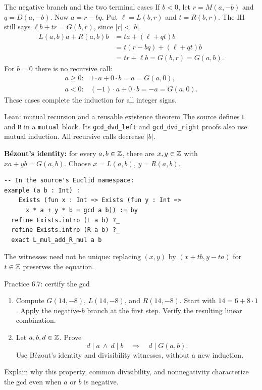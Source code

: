 \begin{frame}{The negative branch and the two terminal cases}
If $b<0$, let $r=M(a,-b)$ and $q=D(a,-b)$.
Now $a=r-bq$. Put $\ell=L(b,r)$ and $t=R(b,r)$.
The IH still says $\ell b+tr=G(b,r)$, since $|r|<|b|$.
\[
\begin{aligned}
 L(a,b)a+R(a,b)b
 &=ta+(\ell+qt)b\\
 &=t(r-bq)+(\ell+qt)b\\
 &=tr+\ell b=G(b,r)=G(a,b).
\end{aligned}
\]
For $b=0$ there is no recursive call:
\[
 \begin{array}{ll}
 a\ge0:&1\cdot a+0\cdot b=a=G(a,0),\\[2pt]
 a<0:&(-1)\cdot a+0\cdot b=-a=G(a,0).
 \end{array}
\]
These cases complete the induction for all integer signs.
\end{frame}

\begin{frame}[fragile]{Lean: mutual recursion and a reusable existence theorem}
The source defines \texttt{L} and \texttt{R} in a \texttt{mutual} block.
Its \texttt{gcd\_dvd\_left} and \texttt{gcd\_dvd\_right} proofs also use
mutual induction. All recursive calls decrease $|b|$.

\textbf{B\'ezout's identity:} for every $a,b\in\mathbb{Z}$, there are $x,y\in\mathbb{Z}$
with $xa+yb=G(a,b)$. Choose $x=L(a,b)$, $y=R(a,b)$.
\begin{lstlisting}
-- In the source's Euclid namespace:
example (a b : Int) :
    Exists (fun x : Int => Exists (fun y : Int =>
      x * a + y * b = gcd a b)) := by
  refine Exists.intro (L a b) ?_
  refine Exists.intro (R a b) ?_
  exact L_mul_add_R_mul a b
\end{lstlisting}
The witnesses need not be unique: replacing $(x,y)$ by
$(x+tb,y-ta)$ for $t\in\mathbb{Z}$ preserves the equation.
\end{frame}

\begin{frame}{Practice 6.7: certify the gcd}
\begin{enumerate}
\item Compute $G(14,-8)$, $L(14,-8)$, and $R(14,-8)$.
Start with $14=6+8\cdot1$. Apply the negative-$b$ branch at the first step.
Verify the resulting linear combination.
\item Let $a,b,d\in\mathbb{Z}$. Prove
\[
 d\mid a\ \land\ d\mid b\quad\Longrightarrow\quad d\mid G(a,b).
\]
Use B\'ezout's identity and divisibility witnesses, without a new induction.
\end{enumerate}
Explain why this property, common divisibility, and nonnegativity characterize
the gcd even when $a$ or $b$ is negative.
\end{frame}

